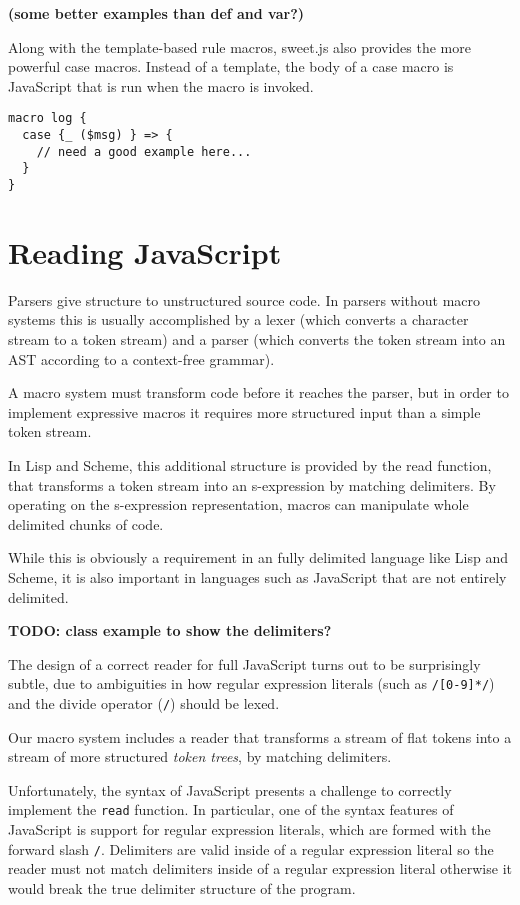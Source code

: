\documentclass[preprint,10pt]{sigplanconf}
\begin{document}
\textbf{(some better examples than def and var?)}

Along with the template-based rule macros, sweet.js also provides the
more powerful case macros. Instead of a template, the body of a case
macro is JavaScript that is run when the macro is invoked.

\begin{lstlisting}
macro log {
  case {_ ($msg) } => {
    // need a good example here...
  }
}
\end{lstlisting}



\section{Reading JavaScript}
\label{sec:read}

Parsers give structure to unstructured source code. In parsers without
macro systems this is usually accomplished by 
a lexer (which converts a character stream to a token stream) and a
parser (which converts the token stream into an AST according to a
context-free grammar).

A macro system must transform code before it reaches the parser, but
in order to implement expressive macros it requires more structured
input than a simple token stream.

In Lisp and Scheme, this additional structure is provided by the read
function, that transforms a token stream into an s-expression by
matching delimiters. By operating on the s-expression representation,
macros can manipulate whole delimited chunks of code.

While this is obviously a requirement in an fully delimited language
like Lisp and Scheme, it is also important in languages such as
JavaScript that are not entirely delimited.

\textbf{TODO: class example to show the delimiters?}

The design of a correct reader for full JavaScript turns out to be
surprisingly subtle, due to ambiguities in how regular expression
literals (such as \lstinline!/[0-9]*/!) and the divide operator
(\lstinline!/!) should be lexed.

Our macro system includes a reader that transforms a stream of flat
tokens into a stream of more structured \emph{token trees}, by
matching delimiters.

Unfortunately, the syntax of JavaScript presents a challenge to
correctly implement the \texttt{read} function. In particular, one of
the syntax features of JavaScript is support for regular expression
literals, which are formed with the forward slash \lstinline!/!.
Delimiters are valid inside of a regular expression literal so the
reader must not match delimiters inside of a regular expression
literal otherwise it would break the true delimiter structure of the
program.
\end{document}
